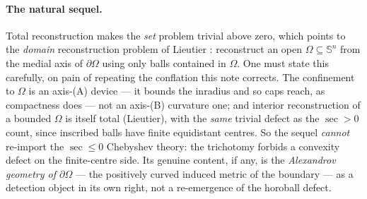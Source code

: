 \documentclass[11pt]{article}
\theoremstyle{remark}
\newcommand{\sect}{\operatorname{sec}}
\newcommand{\Sn}{\mathbb{S}^{n}}
\begin{document}
\paragraph{The natural sequel.} Total reconstruction makes the \emph{set}
problem trivial above zero, which points to the \emph{domain}
reconstruction problem of Lieutier \cite{Lie}: reconstruct an open
$\Omega\subseteq\Sn$ from the medial axis of $\partial\Omega$ using only
balls contained in $\Omega$. One must state this carefully, on pain of
repeating the conflation this note corrects. The confinement to $\Omega$ is
an axis-(A) device --- it bounds the inradius and so caps reach, as
compactness does --- not an axis-(B) curvature one; and interior
reconstruction of a bounded $\Omega$ is itself total (Lieutier), with the
\emph{same} trivial defect as the $\sect>0$ count, since inscribed balls
have finite equidistant centres. So the sequel \emph{cannot} re-import the
$\sect\le0$ Chebyshev theory: the trichotomy forbids a convexity defect on
the finite-centre side. Its genuine content, if any, is the
\emph{Alexandrov geometry of $\partial\Omega$} --- the positively curved
induced metric of the boundary --- as a detection object in its own right,
not a re-emergence of the horoball defect.
\end{document}

